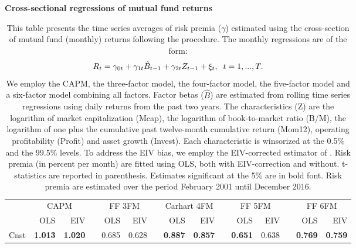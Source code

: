 \begin{singlespacing}
\begin{table}[H]
\setlength{\tabcolsep}{4.5pt}
\centering
 {\captionsetup{justification=centering,singlelinecheck=off}
\caption{\bfseries Cross-sectional regressions of mutual fund returns} \label{table2}}
\caption*{This table presents the time series averages of risk premia ($\gamma$) estimated using the cross-section of mutual fund (monthly) returns following the \citet{fama1973risk} procedure. The monthly regressions are of the form: 
\begin{equation*}
R_{t} = \gamma_{0t} + \gamma_{1t}\hat{B}_{t-1} + \gamma_{2t}Z_{t-1} + \xi_{t}, \hspace{0.2cm} t=1,...,T.
\end{equation*} We employ the CAPM, the \citet{fama1993common} three-factor model, the \citet{carhart1997persistence} four-factor model, the \citet{FAMA20151} five-factor model and a six-factor model combining all factors. Factor betas ($\hat{B}$) are estimated from rolling time series regressions using daily returns from the past two years. The characteristics (Z) are the logarithm of market capitalization (Mcap), the logarithm of book-to-market ratio (B/M), the logarithm of one plus the cumulative past twelve-month cumulative return (Mom12), operating profitability (Profit) and asset growth (Invest). Each characteristic is winsorized at the 0.5\% and the 99.5\% levels. To address the EIV bias, we employ the EIV-corrected estimator of \citet{chordia2015cross}. Risk premia (in percent per month) are fitted using OLS, both with EIV-correction and without. \citet{fama1973risk} t-statistics are reported in parenthesis. Estimates significant at the 5\% are in bold font. Risk premia are estimated over the period February 2001 until December 2016.}
 \small
\label{my-label}
\begin{tabular}{lrrrrrrrrrrrrrr}
\hline
      & \multicolumn{2}{c}{CAPM}        &           & \multicolumn{2}{c}{FF 3FM}      &           & \multicolumn{2}{c}{Carhart 4FM}  &           & \multicolumn{2}{c}{FF 5FM}       &           & \multicolumn{2}{c}{FF 6FM}       \\ \cline{2-3} \cline{5-6} \cline{8-9} \cline{11-12} \cline{14-15} 
      & OLS            & EIV            &           & OLS            & EIV            &           & OLS            & EIV             &           & OLS            & EIV             &           & OLS            & EIV             \\ \hline
Cnst  & \textbf{1.013} & \textbf{1.020} &           & 0.685          & 0.628          &           & \textbf{0.887} & \textbf{0.857} &  & \textbf{0.651} & 0.638          &  & \textbf{0.769}  & \textbf{0.759} \\

\end{tabular}
\end{table}
\end{singlespacing}
